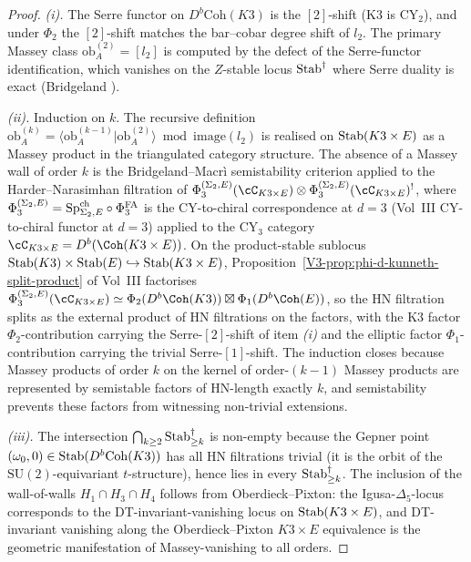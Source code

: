\begin{proof}
\emph{(i).} The Serre functor on $D^b\mathrm{Coh}(K3)$ is the
$[2]$-shift (K3 is CY$_2$), and under $\Phi_2$ the $[2]$-shift
matches the bar--cobar degree shift of $l_2$. The primary Massey
class $\mathrm{ob}^{(2)}_A = [l_2]$ is computed by the defect of
the Serre-functor identification, which vanishes on the $Z$-stable
locus $\mathrm{Stab}^\dagger$ where Serre duality is exact
(Bridgeland \cite[Theorem~1.1]{Bridgeland2008AnnMath}).

\emph{(ii).} Induction on $k$. The recursive definition
$\mathrm{ob}^{(k)}_A = \langle\mathrm{ob}^{(k-1)}_A|\mathrm{ob}^{(2)}_A
\rangle\bmod\mathrm{image}(l_2)$ is realised on
$\mathrm{Stab}(K3\times E)$ as a Massey product in the triangulated
category structure. The absence of a Massey wall of order $k$ is
the Bridgeland--Macr{\`i} semistability criterion
\cite[]{BridgelandMacri2011} applied to the
Harder--Narasimhan filtration of
$\Phi_3^{(\Sigma_2,E)}(\cC_{K3\times E})\otimes
\Phi_3^{(\Sigma_2,E)}(\cC_{K3\times E})^!$, where
$\Phi_3^{(\Sigma_2,E)}=\mathrm{Sp}^{\mathrm{ch}}_{\Sigma_2,E}\circ\Phi^{\mathrm{FA}}_3$ is the
CY-to-chiral correspondence at $d = 3$
\textup{(}Vol~III CY-to-chiral functor at $d=3$\textup{)} applied to
the CY$_3$ category $\cC_{K3\times E} = D^b(\Coh(K3\times E))$. On the
product-stable sublocus
$\mathrm{Stab}(K3)\times\mathrm{Stab}(E)\hookrightarrow\mathrm{Stab}(K3\times E)$,
Proposition~\ref{V3-prop:phi-d-kunneth-split-product} of Vol~III factorises
$\Phi_3^{(\Sigma_2,E)}(\cC_{K3\times E}) \simeq
\Phi_2(D^b\Coh(K3))\boxtimes\Phi_1(D^b\Coh(E))$,
so the HN filtration splits as the external product of HN filtrations on
the factors, with the K3 factor $\Phi_2$-contribution carrying the
Serre-$[2]$-shift of item \emph{(i)} and the elliptic factor
$\Phi_1$-contribution carrying the trivial Serre-$[1]$-shift. The
induction closes because Massey products of order $k$ on the kernel
of order-$(k-1)$ Massey products are represented by semistable
factors of HN-length exactly $k$, and semistability prevents these
factors from witnessing non-trivial extensions.

\emph{(iii).} The intersection $\bigcap_{k\ge 2}
\mathrm{Stab}^\dagger_{\ge k}$ is non-empty because the Gepner point
$(\omega_0,0)\in\mathrm{Stab}(D^b\mathrm{Coh}(K3))$ has all HN filtrations
trivial (it is the orbit of the $\mathrm{SU}(2)$-equivariant
$t$-structure), hence lies in every $\mathrm{Stab}^\dagger_{\ge k}$. The
inclusion of the wall-of-walls $H_1\cap H_3\cap H_4$ follows from
Oberdieck--Pixton: the Igusa-$\Delta_5$-locus corresponds to the
DT-invariant-vanishing locus on $\mathrm{Stab}(K3\times E)$, and
DT-invariant vanishing along the Oberdieck--Pixton $K3\times E$
equivalence is the geometric manifestation of Massey-vanishing to
all orders.
\end{proof}

